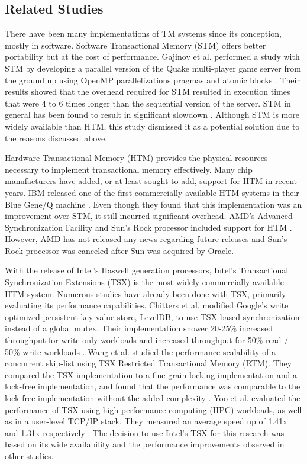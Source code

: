 \documentclass[a4paper]{article}
\begin{document}
\subsection{\textbf{Related Studies}}

\indent 
There have been many implementations of TM systems since its conception, mostly
in software.  Software Transactional Memory (STM) offers better portability but
at the cost of performance.  Gajinov et al. performed a study with STM by
developing a parallel version of the Quake multi-player game server from the
ground up using OpenMP parallelizations pragmas and atomic blocks
\cite{quake_stm}.  Their results showed that the overhead required for STM
resulted in execution times that were 4 to 6 times longer than the sequential
version of the server.  STM in general has been found to result in significant
slowdown \cite{stm_cascaval}.  Although STM is more widely available than HTM,
this study dismissed it as a potential solution due to the reasons discussed
above.
\par

\indent 
Hardware Transactional Memory (HTM) provides the physical resources
necessary to implement transactional memory effectively.  Many chip manufacturers
have added, or at least sought to add, support for HTM in recent years.  IBM
released one of the first commercially available HTM systems in their Blue
Gene/Q machine \cite{blue_wang}.  Even though they found that this
implementation was an improvement over STM, it still incurred significant
overhead.  AMD's Advanced Synchronization Facility and Sun's Rock processor
included support for HTM \cite{chung_amd,rock_dice}.  However, AMD has not
released any news regarding future releases and Sun's Rock processor was
canceled after Sun was acquired by Oracle.
\par

\indent 
With the release of Intel's Haswell generation processors, Intel's
Transactional Synchronization Extensions (TSX) is the most widely commercially
available HTM system.  Numerous studies have already been done with TSX,
primarily evaluating its performance capabilities.  Chitters et al. modified
Google's write optimized persistent key-value store, LevelDB, to use TSX based
synchronization instead of a global mutex.  Their implementation shower 20-25\%
increased throughput for write-only workloads and increased throughput for 50\%
read / 50\% write workloads \cite{chitters_tsx}.  Wang et al. studied the
performance scalability of a concurrent skip-list using TSX Restricted
Transactional Memory (RTM).  They compared the TSX implementation to a
fine-grain locking implementation and a lock-free implementation, and found that
the performance was comparable to the lock-free implementation without the added
complexity \cite{wang_tsx}.  Yoo et al. evaluated the performance of TSX using
high-performance computing (HPC) workloads, as well as in a user-level TCP/IP
stack.  They measured an average speed up of 1.41x and 1.31x respectively
\cite{yoo_tsx}.  The decision to use Intel's TSX for this research was based on
its wide availability and the performance improvements observed in other
studies.
\par
\end{document}
